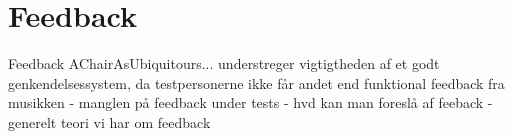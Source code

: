 \section{Feedback}
\label{DiskussionFeedback}
%
Feedback
AChairAsUbiquitours... understreger vigtigtheden af et godt genkendelsessystem, da testpersonerne ikke får andet end funktional feedback fra musikken - manglen på feedback under tests - hvd kan man foreslå af feeback - generelt teori vi har om feedback